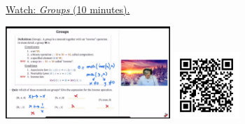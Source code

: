 
\begin{minipage}{10cm}
    \href{https://act4e-spring21.netlify.app/videos/spring2021-semi-mon-gro:groups.html}{Watch: \emph{Groups} (10 minutes).}
        
    \href{https://act4e-spring21.netlify.app/videos/spring2021-semi-mon-gro:groups.html}{\includegraphics[height=3.5cm]{spring2021-semi-mon-gro:groups/thumbnails.jpg}}
    \href{https://act4e-spring21.netlify.app/videos/spring2021-semi-mon-gro:groups.html}{\includegraphics[height=2.5cm]{spring2021-semi-mon-gro:groups/qrcode.png}}
\end{minipage}

